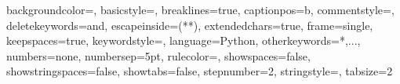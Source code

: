 \documentclass{MScthesisITEM}
\begin{document}
 {backgroundcolor=\color{myback}, basicstyle=\small, breaklines=true, captionpos=b,                commentstyle=\color{mygreen}, deletekeywords={and}, escapeinside={(*}{*)}, extendedchars=true, frame=single, keepspaces=true, keywordstyle=\color{black}, language=Python, otherkeywords={*,...}, numbers=none, numbersep=5pt, rulecolor=\color{mygray}, showspaces=false, showstringspaces=false, showtabs=false, stepnumber=2, stringstyle=\color{mymauve}, tabsize=2} 












\cleardoublepage


\cleardoublepage

 
 \cleardoublepage



\cleardoublepage


\tableofcontents*
\cleardoublepage

\listoffigures
\cleardoublepage

\listoftables
\cleardoublepage

\lstlistoflistings
\cleardoublepage


\printglossary[title=List of Acronyms,type=\acronymtype] %
\cleardoublepage

\pagestyle{ruled}



\end{document}
